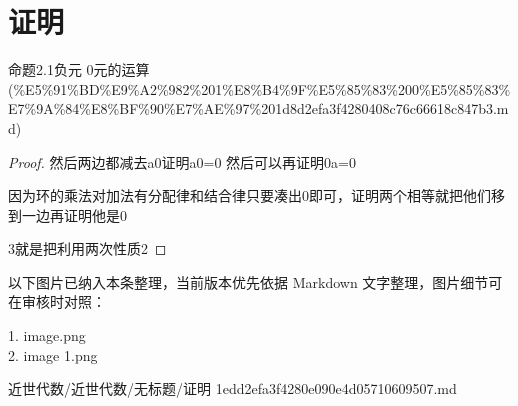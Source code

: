 \section*{证明}

\begin{note}[来源上级主题]

命题2.1负元 0元的运算 (\%E5\%91\%BD\%E9\%A2\%982\%201\%E8\%B4\%9F\%E5\%85\%83\%200\%E5\%85\%83\%E7\%9A\%84\%E8\%BF\%90\%E7\%AE\%97\%201d8d2efa3f4280408c76c66618c847b3.md)

\end{note}

\begin{proof}

然后两边都减去a0证明a0=0 然后可以再证明0a=0

因为环的乘法对加法有分配律和结合律只要凑出0即可，证明两个相等就把他们移到一边再证明他是0

3就是把利用两次性质2

\end{proof}

\begin{note}[关联图片]
以下图片已纳入本条整理，当前版本优先依据 Markdown 文字整理，图片细节可在审核时对照：

1. image.png\\
2. image 1.png\\

\end{note}

\begin{note}[来源路径]

近世代数/近世代数/无标题/证明 1edd2efa3f4280e090e4d05710609507.md

\end{note}
